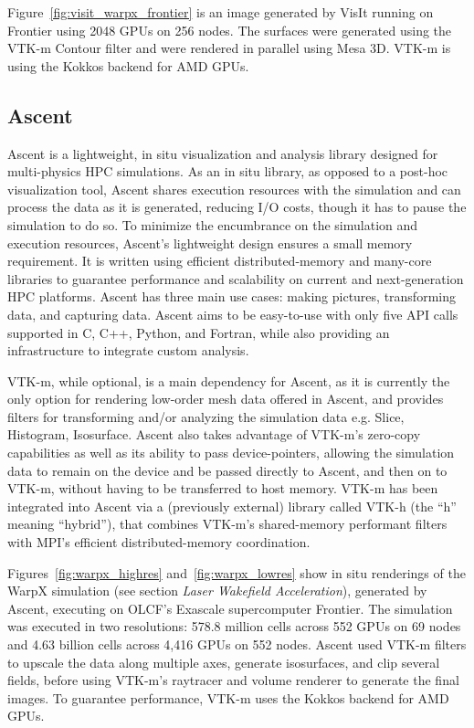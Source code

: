 Figure~\ref{fig:visit_warpx_frontier} is an image generated by VisIt running on Frontier using 2048 GPUs on 256 nodes. The surfaces were generated using the VTK-m Contour filter and were rendered in parallel using Mesa 3D. VTK-m is using the Kokkos backend for AMD GPUs.

\subsection{Ascent}
Ascent is a lightweight, in situ visualization and analysis library designed for multi-physics HPC simulations. As an in situ library, as opposed to a post-hoc visualization tool, Ascent shares execution resources with the simulation and can process the data as it is generated, reducing I/O costs, though it has to pause the simulation to do so. To minimize the encumbrance on the simulation and execution resources, Ascent's lightweight design ensures a small memory requirement. It is written using efficient distributed-memory and many-core libraries to guarantee performance and scalability on current and next-generation HPC platforms. Ascent has three main use cases: making pictures, transforming data, and capturing data. Ascent aims to be easy-to-use with only five API calls supported in C, C++, Python, and Fortran, while also providing an infrastructure to integrate custom analysis.

VTK-m, while optional, is a main dependency for Ascent, as it is currently the only option for rendering low-order mesh data offered in Ascent, and provides filters for transforming and/or analyzing the simulation data e.g. Slice, Histogram, Isosurface. Ascent also takes advantage of VTK-m's zero-copy capabilities as well as its ability to pass device-pointers, allowing the simulation data to remain on the device and be passed directly to Ascent, and then on to VTK-m, without having to be transferred to host memory. VTK-m has been integrated into Ascent via a (previously external) library called VTK-h (the ``h'' meaning ``hybrid''), that combines VTK-m's shared-memory performant filters with MPI's efficient distributed-memory coordination. 

Figures~\ref{fig:warpx_highres} and~\ref{fig:warpx_lowres} show in situ renderings of the WarpX simulation (see section \textit{Laser Wakefield Acceleration}), generated by Ascent, executing on OLCF's Exascale supercomputer Frontier.
The simulation was executed in two resolutions: 578.8 million cells across 552 GPUs on 69 nodes and 4.63 billion cells across 4,416 GPUs on 552 nodes.
Ascent used VTK-m filters to upscale the data along multiple axes, generate isosurfaces, and clip several fields, before using VTK-m's raytracer and volume renderer to generate the final images.
To guarantee performance, VTK-m uses the Kokkos backend for AMD GPUs. 


